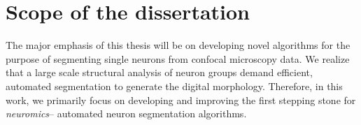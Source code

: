 %
%

\section{Scope of the dissertation}
The major emphasis of this thesis will be on developing novel  algorithms for the purpose of segmenting single neurons from confocal microscopy data. We realize that a large scale structural analysis of neuron groups demand efficient, automated segmentation to generate the digital morphology. Therefore, in this work, we primarily focus on developing and improving the first stepping stone for \textit{neuromics}-- automated neuron segmentation algorithms. 

